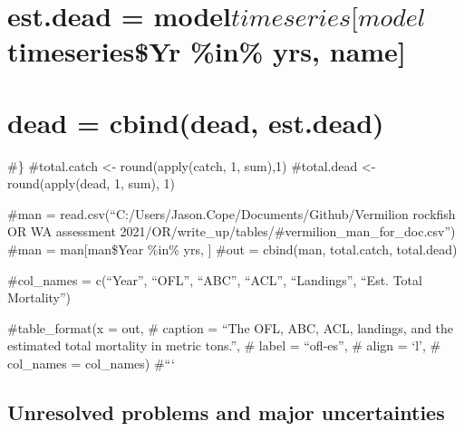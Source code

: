 \documentclass[11pt,
  english,
  letterpaper,
]{article}
\begin{document}
\hypertarget{est.dead-modeltimeseriesmodeltimeseriesyr-in-yrs-name}{%
\section{\texorpdfstring{est.dead = model\(timeseries[model\)timeseries\$Yr \%in\% yrs, name{]}}{est.dead = modeltimeseries{[}modeltimeseries\$Yr \%in\% yrs, name{]}}}\label{est.dead-modeltimeseriesmodeltimeseriesyr-in-yrs-name}}

\hypertarget{dead-cbinddead-est.dead}{%
\section{dead = cbind(dead, est.dead)}\label{dead-cbinddead-est.dead}}

\#\} \#total.catch \textless- round(apply(catch, 1, sum),1) \#total.dead \textless- round(apply(dead, 1, sum), 1)

\#man = read.csv(``C:/Users/Jason.Cope/Documents/Github/Vermilion rockfish OR WA assessment 2021/OR/write\_up/tables/\#vermilion\_man\_for\_doc.csv'') \#man = man{[}man\$Year \%in\% yrs, {]} \#out = cbind(man, total.catch, total.dead)

\#col\_names = c(``Year'', ``OFL'', ``ABC'', ``ACL'', ``Landings'', ``Est. Total Mortality'')

\#table\_format(x = out, \# caption = ``The OFL, ABC, ACL, landings, and the estimated total mortality in metric tons.'', \# label = ``ofl-es'', \# align = `l', \# col\_names = col\_names) \#```

\hypertarget{unresolved-problems-and-major-uncertainties}{%
\subsection*{Unresolved problems and major uncertainties}\label{unresolved-problems-and-major-uncertainties}}
\end{document}
